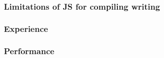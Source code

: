\begin{frame}
\frametitle{\bf Limitations of JS for compiling writing}

\end{frame}

\begin{frame}
\frametitle{\bf Experience}

\end{frame}

\begin{frame}
\frametitle{\bf Performance}

\end{frame}


